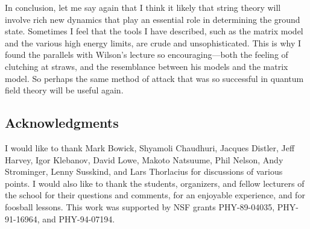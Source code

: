 
In conclusion, let me say again that I think it likely that string
theory will involve rich new dynamics that play an essential
role in determining the ground state.  Sometimes I feel that the
tools I have described, such as the matrix model and the various
high energy limits, are crude and unsophisticated.
This is why I found the parallels with Wilson's lecture so
encouraging---both the feeling of clutching at straws, and the
resemblance between his models and the matrix model.  So perhaps
the same method of attack that was so successful in quantum field
theory will be useful again.

\subsection*{Acknowledgments}

I would like to thank Mark Bowick, Shyamoli Chaudhuri, Jacques
Distler, Jeff Harvey, Igor Klebanov,
David Lowe, Makoto Natsuume, Phil Nelson,
Andy Strominger, Lenny Susskind, and Lars Thorlacius for
discussions of various points.  I would also like to thank the
students, organizers, and fellow lecturers of the school for their
questions and comments, for an enjoyable experience, and for foosball
lessons.  This work was supported by NSF grants PHY-89-04035,
PHY-91-16964, and PHY-94-07194.

\vfill
 
\pagebreak

